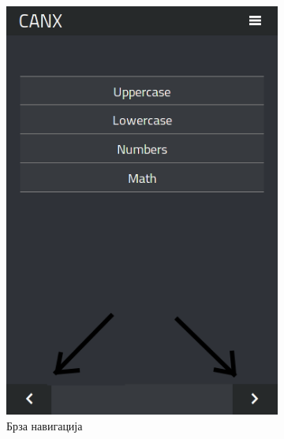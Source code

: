 \documentclass[a4paper]{article}
\begin{document}
\begin{figure}
\centering
\begin{subfigure}{.5\textwidth}
  \centering
  \includegraphics[width=.9\linewidth]{fast_nav}
  \caption{Брза навигација}
  \label{fig:sub1}
\end{subfigure}%
\begin{subfigure}{.5\textwidth}
  \centering

\end{subfigure}
\end{figure}
\end{document}
